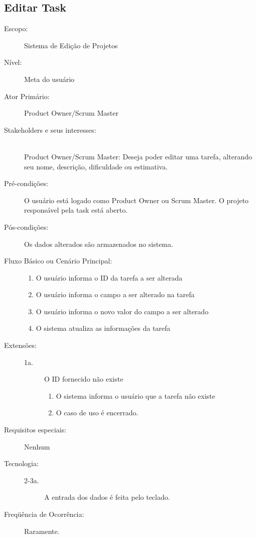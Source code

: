\documentclass[brazil,times]{abnt}
\begin{document}
\subsection{Editar Task}
\begin{description}
\item[Escopo:] Sistema de Edição de Projetos
\item[Nível:] Meta do usuário
\item[Ator Primário:] Product Owner/Scrum Master

\item[Stakeholders e seus interesses:] \hfill \\ 
Product Owner/Scrum Master: Deseja poder editar uma tarefa, alterando seu nome,
descrição, dificuldade ou estimativa.

\item[Pré-condições:] O usuário está logado como Product Owner ou Scrum Master.
O projeto responsável pela task está aberto.

\item[Pós-condições:] Os dados alterados são armazenados no sistema.

\item[Fluxo Básico ou Cenário Principal:] \hfill
\begin{enumerate}
  \item O usuário informa o ID da tarefa a ser alterada
  \item O usuário informa o campo a ser alterado na tarefa
  \item O usuário informa o novo valor do campo a ser alterado
  \item O sistema atualiza as informações da tarefa
\end{enumerate}

\item[Extensões:] \hfill
\begin{description}
	\item[1a.] O ID fornecido não existe
		\begin{enumerate}
 			\item O sistema informa o usuário que a tarefa não existe
 			\item O caso de uso é encerrado.
		\end{enumerate}
\end{description}
\item[Requisitos especiais:] Nenhum

\item[Tecnologia:] \hfill
\begin{description} 
	\item[2-3a.] A entrada dos dados é feita pelo teclado.
\end{description}
\item[Freqüência de Ocorrência:] Raramente.

\end{description}
\end{document}

